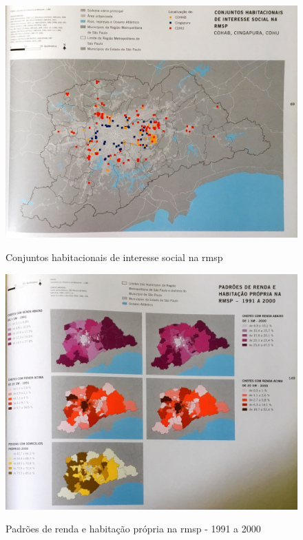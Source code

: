 	\begin{figure}[h]
		\centering
		\caption{Conjuntos habitacionais de interesse social na \gls{rmsp}}
		\includegraphics[width=\linewidth,keepaspectratio]{img/spmetrop_pag069}
		\label{spmetrop_pag069}
	\end{figure}

	\begin{figure}[h]
		\centering
		\caption{Padrões de renda e habitação própria na \gls{rmsp} - 1991 a 2000}
		\includegraphics[width=\linewidth,keepaspectratio]{img/spmetrop_pag149}
		\label{spmetrop_pag149}
	\end{figure}
	
